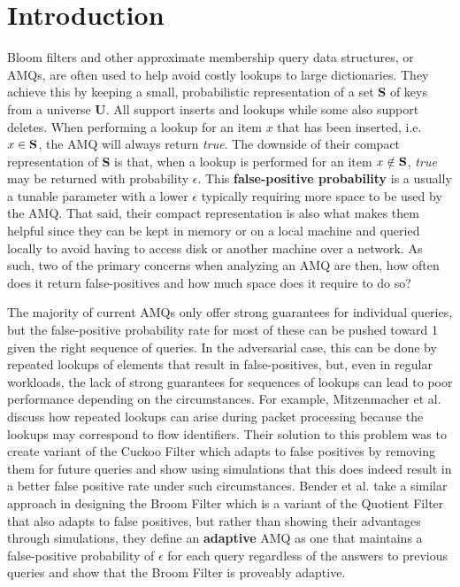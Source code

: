 \documentclass[11pt]{article}
\begin{document}
\section{Introduction}
	Bloom filters and other approximate membership query data structures, or AMQs, are often used to help avoid costly lookups to large dictionaries.  They achieve this by keeping a small, probabilistic representation of a set {\bf S} of keys from a universe {\bf U}.  All support inserts and lookups while some also support deletes.  When performing a lookup for an item $x$ that has been inserted, i.e. $x\in {\bf S}$, the AMQ will always return {\it true}.  The downside of their compact representation of {\bf S} is that, when a lookup is performed for an item $x \notin {\bf S}$, {\it true} may be returned with probability $\epsilon$.  This {\bf false-positive probability} is a usually a tunable parameter with a lower $\epsilon$ typically requiring more space to be used by the AMQ.  That said, their compact representation is also what makes them helpful since they can be kept in memory or on a local machine and queried locally to avoid having to access disk or another machine over a network.  As such, two of the primary concerns when analyzing an AMQ are then, how often does it return false-positives and how much space does it require to do so?

	The majority of current AMQs only offer strong guarantees for individual queries, but the false-positive probability rate for most of these can be pushed toward 1 given the right sequence of queries.  In the adversarial case, this can be done by repeated lookups of elements that result in false-positives, but, even in regular workloads, the lack of strong guarantees for sequences of lookups can lead to poor performance depending on the circumstances.  For example, Mitzenmacher et al. \cite{adaptive-cuckoo} discuss how repeated lookups can arise during packet processing because the lookups may correspond to flow identifiers.  Their solution to this problem was to create variant of the Cuckoo Filter \cite{cuckoo-filter} which adapts to false positives by removing them for future queries and show using simulations that this does indeed result in a better false positive rate under such circumstances.  Bender et al. \cite{broom-filter} take a similar approach in designing the Broom Filter which is a variant of the Quotient Filter \cite{quotient-filter} that also adapts to false positives, but rather than showing their advantages through simulations, they define an {\bf adaptive} AMQ as one that maintains a false-positive probability of $\epsilon$ for each query regardless of the answers to previous queries and show that the Broom Filter is proveably adaptive.
	
\end{document}
